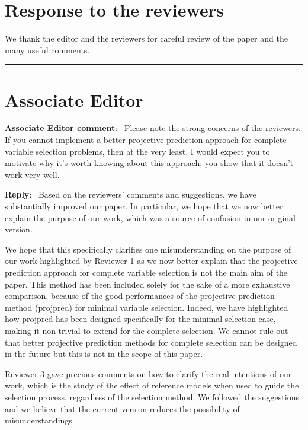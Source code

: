 \documentclass[11pt]{article}
\newcounter{reviewer}
\newenvironment{aecomment}
{\medskip \noindent \begin{sf}\textbf{Associate Editor comment}:\  }
	{\medskip \end{sf}}
\newenvironment{reply}
   {\medskip \noindent \textbf{Reply}:\  }
   {\medskip}
\newcommand{\todo}{\subsection*{\textcolor{red}{To do (comment out when done)}:}}
\begin{document}
\section*{Response to the reviewers}
We thank the editor and the reviewers for careful review of the paper and the many useful comments.
\bigskip 
\hrule
\medskip 
\section*{Associate Editor}

\begin{aecomment}
Please note the strong concerns of the reviewers. If you cannot implement a better projective prediction approach for complete variable selection problems, then at the very least, I would expect you to motivate why it's worth knowing about this approach; you show that it doesn't work very well.
\end{aecomment}

\begin{reply}
Based on the reviewers' comments and suggestions, we have substantially improved our paper. In particular, we hope that we now better explain the purpose of our work, which was a source of confusion in our original version.

We hope that this specifically clarifies one misunderstanding on the purpose of our work highlighted by Reviewer 1 as we now better explain that the projective prediction approach for complete variable selection is not the main aim of the paper. This method has been included solely for the sake of a more exhaustive comparison, because of the good performances of the projective prediction method (projpred) for minimal variable selection. Indeed, we have highlighted how projpred has been designed specifically for the minimal selection case, making it non-trivial to extend for the complete selection. We cannot rule out that better projective prediction methods for complete selection can be designed in the future but this is not in the scope of this paper. 

Reviewer 3 gave precious comments on how to clarify the real intentions of our work, which is the study of the effect of reference models when used to guide the selection process, regardless of the selection method. We followed the suggestions and we believe that the current version reduces the possibility of misunderstandings.
\end{reply}

\end{document}
